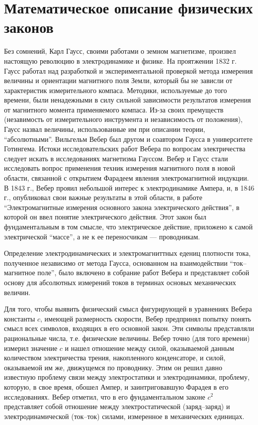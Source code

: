\documentclass[12pt, oneside, a4paper]{article}
\begin{document}
\section*{Математическое описание физических законов}
Без сомнений, Карл Гаусс, своими работами о земном магнетизме, произвел настоящую революцию в электродинамике и физике.  На проятжении 1832 г. Гаусс работал над разработкой и экспериментальной проверкой метода измерения величины и ориентации магнитного поля Земли, который бы не зависли от характеристик измерительного компаса. Методики, используемые до того времени, были ненадежными в силу сильной зависимости результатов измерения от магнитного момента применяемого компаса. Из-за своих премуществ (незавимость от измерительного инструмента и независимость от положения), Гаусс назвал величины, использованные им при описании теории, ``абсолютными''. Вильгельм Вебер  был другом и соавтором Гаусса в университете Готингема. Истоки исследовательских работ Вебера по вопросам электричества следует искать в исследованиях магнетизма Гауссом. Вебер и Гаусс стали исследовать вопрос применения техник измерения магнитного поля в новой области, связанной с открытием Фарадеем явления электромагнитной индукции. В 1843 г., Вебер прояил небольшой интерес к электродинамике Ампера, и, в 1846 г., опубликовал свои важные результаты в этой области, в работе ``Электромагнитные измерения основного закона электрического действия'', в которой он ввел понятие электрического действия. Этот закон был фундаментальным в том смысле, что электрическое действие, приложено к самой электрической ``массе'', а не к ее переносчикам --- проводникам. 

Определение электродинамических и электромагниттных едениц плотности тока, полученное независимо от метода Гаусса, основанном на взаимодействии ``ток--магнитное поле'', было включено в собрание работ Вебера и представляет собой основу для абсолютных измерений токов в терминах основых механических величин.

Для того, чтобы выявить физический смысл фигурирующей в уравнениях Вебера константы $c$, имеющей размерность скорости, Вебер предпринял попытку понять смысл всех символов, входящих в его основной закон. Эти символы представляли рациональные числа, т.е. физические величины. Вебер точно (для того времени) измерил значение $c$ и нашел отношение между силой, оказываемой данным количеством электричества трения, накопленного  конденсаторе, и силой, оказываемой им же, движущемся по проводнику. Этим он решил давно известную проблему связи между электростатики и электродинамики, проблему, которую, в свое время, обошел Ампер, и заинтриговавшую Фарадея в его исследованиях. Вебер отметил, что в его фундаментальном законе $c^2$ представляет собой отношение между электростатической (заряд--заряд) и электродинамической (ток--ток) силами, измеренное в механических единицах.
\end{document}
